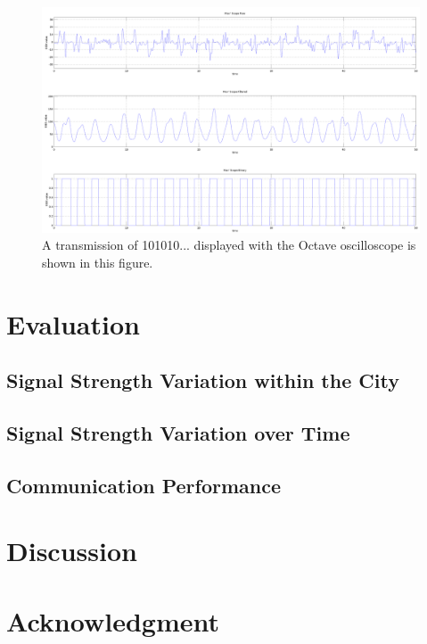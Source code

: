 \documentclass[conference]{IEEEtran}
\begin{document}
\begin{figure}[h]
\centering
\includegraphics[width=\columnwidth]{./fig/osci}
\caption{A transmission of 101010... displayed with the Octave oscilloscope is shown in this figure.}
\label{fig:osci}
\end{figure}

\section{Evaluation}

\subsection{Signal Strength Variation within the City}

\subsection{Signal Strength Variation over Time}

\subsection{Communication Performance}

\section{Discussion}



\section*{Acknowledgment}
\end{document}
